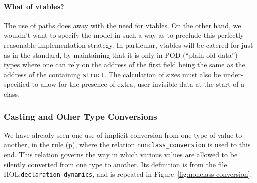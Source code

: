 \documentclass[11pt]{article}
\newcommand{\HOLfile}[1]{HOL:\texttt{#1}}
\begin{document}
\paragraph{What of vtables?}
The use of paths does away with the need for vtables.  On the other
hand, we wouldn't want to specify the model in such a way as to
preclude this perfectly reasonable implementation strategy.  In
particular, vtables will be catered for just as in the standard, by
maintaining that it is only in POD (``plain old data'') types where
one can rely on the address of the first field being the same as the
address of the containing \texttt{struct}.  The calculation of sizes
must also be under-specified to allow for the presence of extra,
user-invisible data at the start of a class.

\subsubsection{Casting and Other Type Conversions}
We have already seen one use of implicit conversion from one type of
value to another, in the rule 
(p\pageref{rule:assign-completes}), where the relation
\texttt{nonclass_conversion} is used to this end.  This relation
governs the way in which various values are allowed to be silently
converted from one type to another.  Its definition is from the file
\HOLfile{declaration_dynamics}, and is repeated in
Figure~\ref{fig:nonclass-conversion}.
\end{document}
